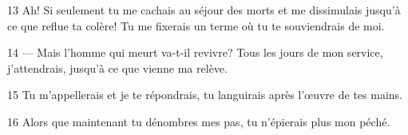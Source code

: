 13 Ah! Si seulement tu me cachais au séjour des morts et me dissimulais jusqu’à ce que reflue ta colère! Tu me fixerais un terme où tu te souviendrais de moi.

14 --- Mais l’homme qui meurt va-t-il revivre? Tous les jours de mon service, j’attendrais, jusqu’à ce que vienne ma relève.

15 Tu m’appellerais et je te répondrais, tu languirais après l’œuvre de tes mains.

16 Alors que maintenant tu dénombres mes pas, tu n’épierais plus mon péché.